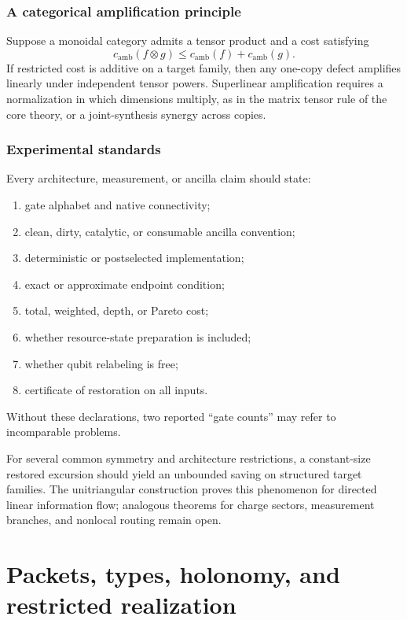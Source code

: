 \subsection{A categorical amplification principle}
Suppose a monoidal category admits a tensor product and a cost satisfying
\[
c_{\mathrm{amb}}(f\otimes g)
\le
c_{\mathrm{amb}}(f)+c_{\mathrm{amb}}(g).
\]
If restricted cost is additive on a target family, then any one-copy defect amplifies linearly under independent tensor powers.  Superlinear amplification requires a normalization in which dimensions multiply, as in the matrix tensor rule of the core theory, or a joint-synthesis synergy across copies.

\subsection{Experimental standards}
Every architecture, measurement, or ancilla claim should state:
\begin{enumerate}
\item gate alphabet and native connectivity;
\item clean, dirty, catalytic, or consumable ancilla convention;
\item deterministic or postselected implementation;
\item exact or approximate endpoint condition;
\item total, weighted, depth, or Pareto cost;
\item whether resource-state preparation is included;
\item whether qubit relabeling is free;
\item certificate of restoration on all inputs.
\end{enumerate}
Without these declarations, two reported ``gate counts'' may refer to incomparable problems.

\begin{conjecturebox}
For several common symmetry and architecture restrictions, a constant-size restored excursion should yield an unbounded saving on structured target families.  The unitriangular construction proves this phenomenon for directed linear information flow; analogous theorems for charge sectors, measurement branches, and nonlocal routing remain open.
\end{conjecturebox}

\chapter{Packets, types, holonomy, and restricted realization}
